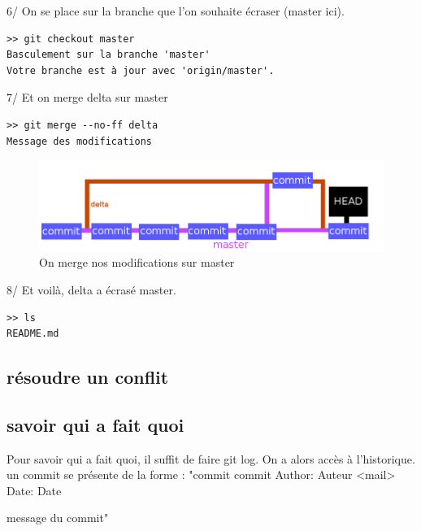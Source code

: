 \documentclass[a4paper,10pt]{report}
\begin{document}
    6/ On se place sur la branche que l'on souhaite écraser (master ici). 
\begin{verbatim}
>> git checkout master
Basculement sur la branche 'master'
Votre branche est à jour avec 'origin/master'.
\end{verbatim}
    7/ Et on merge delta sur master
\begin{verbatim}
>> git merge --no-ff delta 
Message des modifications
\end{verbatim}
\begin{figure}[h!]
  \begin{center}
    \includegraphics[scale=0.3]{images/6exp}
    \caption{On merge nos modifications sur master}
    \label{6exp}
  \end{center}
\end{figure}
    8/ Et voilà, delta a écrasé master.
\begin{verbatim}
>> ls
README.md
\end{verbatim}


     \subsection{résoudre un conflit}
     \subsection{savoir qui a fait quoi}
     Pour savoir qui a fait quoi, il suffit de faire git log. On a alors accès à l'historique. un commit se présente de la forme : 
     "commit \no commit
Author: Auteur <mail>
Date:   Date

    message du commit"
\end{document}

